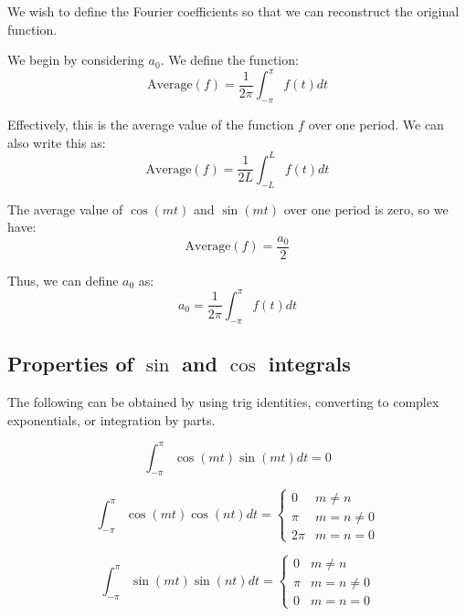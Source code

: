 We wish to define the Fourier coefficients so that we can reconstruct the original function.

We begin by considering $a_0$. We define the function:
\begin{equation*}
\text{Average}(f) = \frac{1}{2\pi} \int_{-\pi}^{\pi} f(t) dt
\end{equation*}

Effectively, this is the average value of the function $f$ over one period. We can also write this as:
\begin{equation*}
\text{Average}(f) = \frac{1}{2L} \int_{-L}^{L} f(t) dt
\end{equation*}

The average value of $\cos(mt)$ and $\sin(mt)$ over one period is zero, so we have:
\begin{equation*}
\text{Average}(f) = \frac{a_0}{2}
\end{equation*}

Thus, we can define $a_0$ as:
\begin{equation*}
\boxed{
a_0 = \frac{1}{2 \pi} \int_{-\pi}^{\pi} f(t) dt
}
\end{equation*}

\subsection{Properties of \texorpdfstring{$\sin$ and $\cos$}{sin and cos} integrals}

The following can be obtained by using trig identities, converting to complex exponentials, or integration by parts.

\begin{equation*}
\int_{-\pi}^{\pi} \cos(mt) \sin(mt) dt = 0
\end{equation*}

\begin{equation*}
\int_{-\pi}^{\pi} \cos(mt) \cos(nt) dt = \begin{cases}
0 & m \neq n \\
\pi & m = n \neq 0 \\
2\pi & m = n = 0
\end{cases}
\end{equation*}

\begin{equation*}
\int_{-\pi}^{\pi} \sin(mt) \sin(nt) dt = \begin{cases}
0 & m \neq n \\
\pi & m = n \neq 0 \\
0 & m = n = 0
\end{cases}
\end{equation*}

